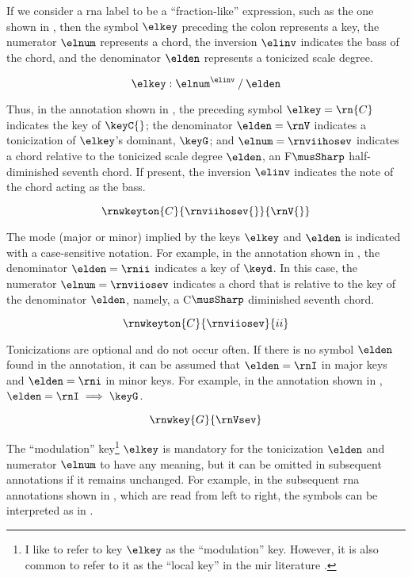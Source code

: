 
If we consider a \gls{rna} label to be a ``fraction-like''
expression, such as the one shown in ,
then the symbol $\elkey$ preceding the colon represents a
key, the numerator $\elnum$ represents a chord, the
inversion $\elinv$ indicates the bass of the chord, and the
denominator $\elden$ represents a tonicized scale degree.

\begin{equation}
    \label{eq:rn_expression}
    \elkey : \elnum^{\elinv} \: / \: \elden
\end{equation}

Thus, in the annotation shown in , the
preceding symbol $\elkey=\rn{C}$ indicates the key of
$\keyC{}$; the denominator $\elden = \rnV$ indicates a
tonicization of $\elkey$'s dominant, $\keyG$; and
$\elnum=\rnviihosev$ indicates a chord relative to the
tonicized scale degree $\elden$, an F$\musSharp$
half-diminished seventh chord. If present, the inversion
$\elinv$ indicates the note of the chord acting as the bass.

\begin{equation}
    \label{eq:rn_example1}
    \rnwkeyton{C}{\rnviihosev{}}{\rnV{}}
\end{equation}


The mode (major or minor) implied by the keys $\elkey$ and
$\elden$ is indicated with a case-sensitive notation. For
example, in the annotation shown in , the
denominator $\elden=\rnii$ indicates a key of $\keyd$. In
this case, the numerator $\elnum = \rnviiosev$ indicates a
chord that is relative to the key of the denominator
$\elden$, namely, a C$\musSharp$ diminished seventh chord.

\begin{equation}
    \label{eq:rn_example2}
    \rnwkeyton{C}{\rnviiosev}{ii}
\end{equation}

Tonicizations are optional and do not occur often. If there
is no symbol $\elden$ found in the annotation, it can be
assumed that $\elden = \rnI$ in major keys and $\elden =
\rni$ in minor keys. For example, in the annotation shown in
, $\elden = \rnI \implies \keyG$.

\begin{equation}
    \label{eq:rn_example3}
    \rnwkey{G}{\rnVsev}
\end{equation}

The ``modulation'' key\footnote{I like to refer to key
$\elkey$ as the ``modulation'' key. However, it is also
common to refer to it as the ``local key'' in the \gls{mir}
literature \parencite{napoleslopez2020local}.} $\elkey$ is
mandatory for the tonicization $\elden$ and numerator
$\elnum$ to have any meaning, but it can be omitted in
subsequent annotations if it remains unchanged. For example,
in the subsequent \gls{rna} annotations shown in
, which are read from left to
right, the symbols can be interpreted as in
.


